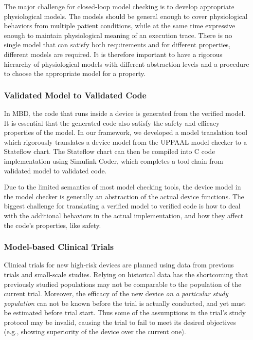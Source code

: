 The major challenge for closed-loop model checking is to develop appropriate physiological models. 
The models should be general enough to cover physiological behaviors from multiple patient conditions, while at the same time expressive enough to maintain physiological meaning of an execution trace.
There is no single model that can satisfy both requirements and for different properties, different models are required.
It is therefore important to have a rigorous hierarchy of physiological models with different abstraction levels and a procedure to choose the appropriate model for a property.

\subsubsection{Validated Model to Validated Code}
In MBD, the code that runs inside a device is generated from the verified model.
It is essential that the generated code also satisfy the safety and efficacy properties of the model.
In our framework, we developed a model translation tool which rigorously translates a device model from the UPPAAL model checker to a Stateflow chart.
The Stateflow chart can then be compiled into C code implementation using Simulink Coder, which completes a tool chain from validated model to validated code.

Due to the limited semantics of most model checking tools, the device model in the model checker is generally an abstraction of the actual device functions.
The biggest challenge for translating a verified model to verified code is how to deal with the additional behaviors in the actual implementation, and how they affect the code's properties, like safety.

\subsubsection{Model-based Clinical Trials}
Clinical trials for new high-risk devices are planned using data from previous trials and small-scale studies. 
Relying on historical data has the shortcoming that previously studied populations may not be comparable to the population of the current trial.
Moreover, the efficacy of the new device \emph{on a particular study population} can not be known before the trial is actually conducted, and yet must be estimated before trial start.
Thus some of the assumptions in the trial's study protocol may be invalid, causing the trial to fail to meet its desired objectives (e.g., showing superiority of the device over the current one).

